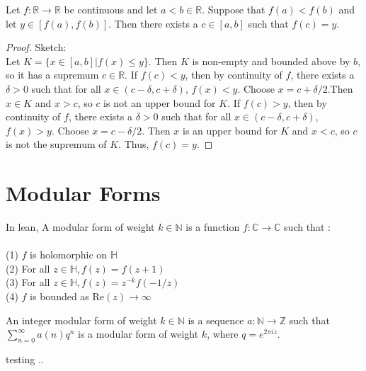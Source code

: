 \begin{theorem}
  \label{thm:intermediate_value}
  \leanok

  Let $f : \mathbb{R} → \mathbb{R}$ be continuous and let $a < b ∈ \mathbb{R}$.
  Suppose that $f(a) < f(b)$ and let $y \in [f(a), f(b)]$.
  Then there exists a $c ∈ [a, b]$ such that $f(c) = y$.
\end{theorem}

\begin{proof}
  \leanok
  Sketch: \\
  Let $K = \{x \in [a, b] | f(x) \le y\}$.
  Then $K$ is non-empty and bounded above by $b$, so it has a supremum $c \in \mathbb{R}$.
  If $f(c) < y$, then by continuity of $f$, there exists a $\delta > 0$ such that for all $x ∈ (c - \delta, c + \delta)$, $f(x) < y$.
  Choose $x = c + \delta/2$.Then $x ∈ K$ and $x > c$, so $c$ is not an upper bound for $K$.
  If $f(c) > y$, then by continuity of $f$, there exists a $\delta > 0$ such that for all $x ∈ (c - \delta, c + \delta)$, $f(x) > y$.
  Choose $x = c - \delta/2$. Then $x$ is an upper bound for $K$ and $x < c$, so $c$ is not the supremum of $K$.
  Thus, $f(c) = y$.

\end{proof}

\section{Modular Forms}

\begin{definition} 
  \label{def:ModularForm}
  \leanok
  In lean, A modular form of weight $k \in \mathbb{N}$ is a function $f : \mathbb{C} → \mathbb{C}$ such that : \\ \\
  (1) $f$ is holomorphic on $\mathbb{H}$ \\
  (2) For all $z \in \mathbb{H}, f(z) = f(z + 1)$ \\
  (3) For all $z \in \mathbb{H}, f(z) = z^{-k} f(-1/z)$ \\
  (4) $f$ is bounded as Re$(z) \to \infty$ \\
\end{definition}

\begin{definition} 
  \label{def:IntegerModularForm}
  \leanok
  An integer modular form of weight $k \in \mathbb{N}$ is a sequence $a : \mathbb{N} → \mathbb{Z}$
  such that $\sum_{n=0}^{\infty} a(n) q^n$ is a modular form of weight $k$, where $q = e ^ {2 \pi i z}.$
\end{definition}

\begin{definition} [Theta]
  \label{def:Theta}
  \leanok
  testing ..

\end{definition}